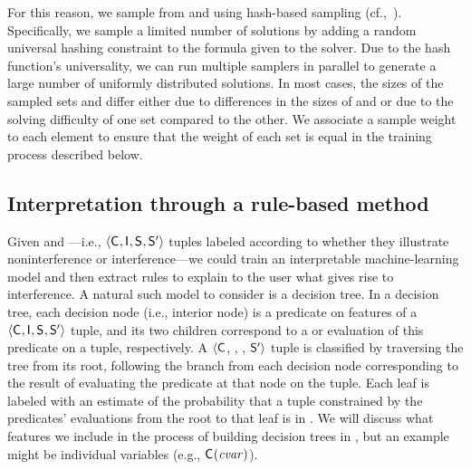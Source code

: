 For this reason, we sample from \noninterferenceSet and
\interferenceSet using hash-based sampling
(cf.,~). Specifically, we sample a limited number of
solutions by adding a random universal hashing constraint to the
formula given to the solver. Due to the hash function's universality,
we can run multiple samplers in parallel to generate a large number of
uniformly distributed solutions. In most cases, the sizes of the
sampled sets \noninterferenceSetSamples and \interferenceSetSamples
differ either due to differences in the sizes of \noninterferenceSet
and \interferenceSet or due to the solving difficulty of one set
compared to the other.  We associate a sample weight to each element
to ensure that the weight of each set is equal in the training process
described below.

\subsection{Interpretation through a rule-based method}
\label{dinome:sec:interpret:rules}

Given \noninterferenceSetSamples and \interferenceSetSamples---i.e.,
$\langle\mathsf{C}_{},\mathsf{I}_{},\mathsf{S}_{},\mathsf{S}'_{}\rangle$ tuples labeled
according to whether they illustrate noninterference or
interference---we could train an interpretable machine-learning model
and then extract rules to explain to the user what gives rise to
interference.  A natural such model to consider is a decision tree.
In a decision tree, each decision node (i.e., interior node) is a
predicate on features of a
$\langle\mathsf{C}_{},\mathsf{I}_{},\mathsf{S}_{},\mathsf{S}'_{}\rangle$ tuple, and its
two children correspond to a \boolTrue or \boolFalse evaluation of
this predicate on a tuple, respectively.  A $\langle\mathsf{C}_{}$,
\AIIFn{}, \SecFn{}, $\mathsf{S}'_{}\rangle$ tuple is classified by
traversing the tree from its root, following the branch from each
decision node corresponding to the result of evaluating the predicate
at that node on the tuple.  Each leaf is labeled with an estimate of
the probability that a tuple constrained by the predicates'
evaluations from the root to that leaf is in \interferenceSet.  We
will discuss what features we include in the process of building
decision trees in , but an example
might be individual variables (e.g., $\mathsf{C}_{}(\mathit{cvar})$).

